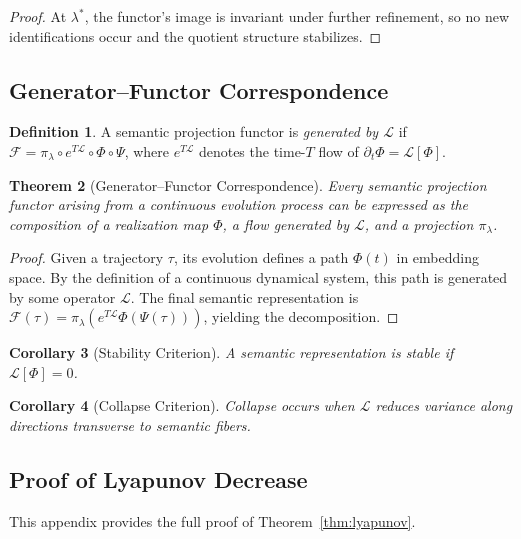 \documentclass[11pt, twoside]{article}
\theoremstyle{plain}
\newtheorem{theorem}{Theorem}[section]
\newtheorem{corollary}[theorem]{Corollary}
\theoremstyle{definition}
\newtheorem{definition}[theorem]{Definition}
\theoremstyle{remark}
\begin{document}
\begin{proof}
At $\lambda^*$, the functor's image is invariant under further refinement, so no new identifications occur and the quotient structure stabilizes.
\end{proof}

\subsection{Generator--Functor Correspondence}

\begin{definition}
A semantic projection functor is \emph{generated by $\mathcal{L}$} if $\mathcal{F} = \pi_\lambda \circ e^{T\mathcal{L}} \circ \Phi \circ \Psi$, where $e^{T\mathcal{L}}$ denotes the time-$T$ flow of $\partial_t \Phi = \mathcal{L}[\Phi]$.
\end{definition}

\begin{theorem}[Generator--Functor Correspondence]
Every semantic projection functor arising from a continuous evolution process can be expressed as the composition of a realization map $\Phi$, a flow generated by $\mathcal{L}$, and a projection $\pi_\lambda$.
\end{theorem}

\begin{proof}
Given a trajectory $\tau$, its evolution defines a path $\Phi(t)$ in embedding space. By the definition of a continuous dynamical system, this path is generated by some operator $\mathcal{L}$. The final semantic representation is $\mathcal{F}(\tau) = \pi_\lambda(e^{T\mathcal{L}} \Phi(\Psi(\tau)))$, yielding the decomposition.
\end{proof}

\begin{corollary}[Stability Criterion]
A semantic representation is stable if $\mathcal{L}[\Phi] = 0$.
\end{corollary}

\begin{corollary}[Collapse Criterion]
Collapse occurs when $\mathcal{L}$ reduces variance along directions transverse to semantic fibers.
\end{corollary}

\subsection{Proof of Lyapunov Decrease}

This appendix provides the full proof of Theorem~\ref{thm:lyapunov}.
\end{document}

